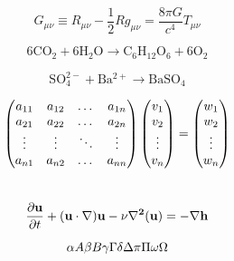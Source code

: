 \documentclass{article}
\begin{document}
\begin{equation*}G_{\mu\nu} \equiv R_{\mu\nu}-\frac{1}{2}Rg_{\mu\nu}=\frac{8\pi G}{c^4}T_{\mu\nu}\end{equation*}\notag


$$\mathrm{6CO_2+6H_2O \to C_6H_{12}O_6+6O_2}$$\notag


$$\mathrm{SO_4^{2-}+Ba^{2+} \to BaSO_4 }$$
\notag

\begin{equation*}
\begin{pmatrix}a_{11}&a_{12}&\dots&a_{1n}\\a_{21}&a_{22}&\dots&a_{2n}\\\vdots&\vdots&\ddots&\vdots\\a_{n1}&a_{n2}&\dots&a_{nn}
\notag
\end{pmatrix}
\begin{pmatrix}v_{1}\\
v_{2}\\\vdots\\v_{n}
\notag
\end{pmatrix}
=
\begin{pmatrix}
w_{1}\\w_{2}\\\vdots\\
w_{n}
\notag
\end{pmatrix}
\end{equation*}
\\


\begin{equation*}\frac{\partial{\bf{u}}}{\partial{t}}+(\bf{u}\cdot\nabla)\bf{u}-\nu\nabla^2\bf(u)=-\nabla h\notag
\end{equation*}



\[             %
\alpha A \beta B \gamma \Gamma \delta \Delta \pi \Pi \omega \Omega \notag
\]  
\end{document}
